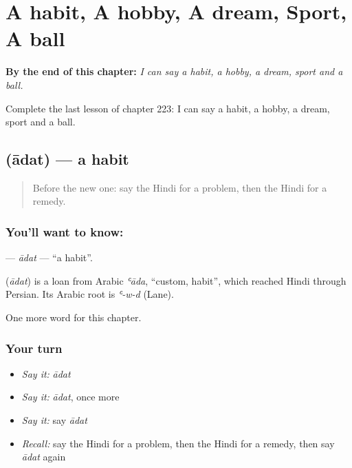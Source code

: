 
\chapter{A habit, A hobby, A dream, Sport, A ball}
\label{ch:hi-a-habit-a-hobby-a-dream-sport-a-ball}

\begin{chapteropening}
\textbf{By the end of this chapter:} \emph{I can say a habit, a hobby, a dream, sport and a ball.}

Complete the last lesson of chapter 223: I can say a habit, a hobby, a dream, sport and a ball.
\end{chapteropening}

\section[\texorpdfstring{\hi{आदत} (ādat)}{आदत (ādat)}]{ (ādat) — a habit}

\label{lesson:HI-C223-adat}



\begin{quote}
Before the new one: say the Hindi for a problem, then the Hindi for a remedy.
\end{quote}

\subsection*{You'll want to know: }
\textbf{} — \emph{ādat} — \textquotedblleft{}a habit\textquotedblright{}.

\begin{cousinweb}
\textbf{} (\emph{ādat}) is a loan from Arabic \emph{ʿāda}, \textquotedblleft{}custom, habit\textquotedblright{}, which reached Hindi through Persian. Its Arabic root is \emph{ʿ-w-d} (Lane).
\end{cousinweb}

\begin{grammarlens}[title={What you've built}]
One more word for this chapter.
\end{grammarlens}

\subsection*{Your turn}
\begin{itemize}
\raggedright
  \item \emph{Say it:} \emph{ādat}
  \item \emph{Say it:} \emph{ādat}, once more
  \item \emph{Say it:} say \emph{ādat}
  \item \emph{Recall:} say the Hindi for a problem, then the Hindi for a remedy, then say \emph{ādat} again
\end{itemize}

